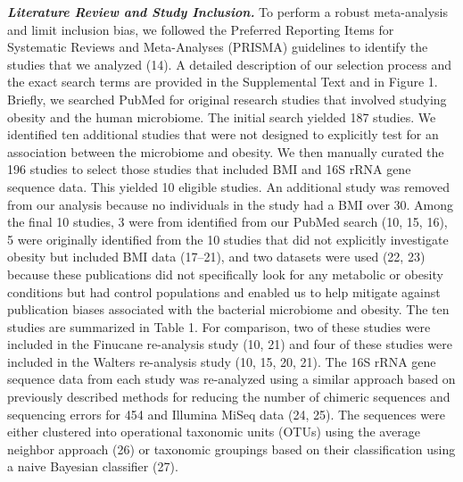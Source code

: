 \documentclass[12pt,]{article}
\begin{document}
\textbf{\emph{Literature Review and Study Inclusion.}} To perform a
robust meta-analysis and limit inclusion bias, we followed the Preferred
Reporting Items for Systematic Reviews and Meta-Analyses (PRISMA)
guidelines to identify the studies that we analyzed (14). A detailed
description of our selection process and the exact search terms are
provided in the Supplemental Text and in Figure 1. Briefly, we searched
PubMed for original research studies that involved studying obesity and
the human microbiome. The initial search yielded 187 studies. We
identified ten additional studies that were not designed to explicitly
test for an association between the microbiome and obesity. We then
manually curated the 196 studies to select those studies that included
BMI and 16S rRNA gene sequence data. This yielded 10 eligible studies.
An additional study was removed from our analysis because no individuals
in the study had a BMI over 30. Among the final 10 studies, 3 were from
identified from our PubMed search (10, 15, 16), 5 were originally
identified from the 10 studies that did not explicitly investigate
obesity but included BMI data (17--21), and two datasets were used (22,
23) because these publications did not specifically look for any
metabolic or obesity conditions but had control populations and enabled
us to help mitigate against publication biases associated with the
bacterial microbiome and obesity. The ten studies are summarized in
Table 1. For comparison, two of these studies were included in the
Finucane re-analysis study (10, 21) and four of these studies were
included in the Walters re-analysis study (10, 15, 20, 21). The 16S rRNA
gene sequence data from each study was re-analyzed using a similar
approach based on previously described methods for reducing the number
of chimeric sequences and sequencing errors for 454 and Illumina MiSeq
data (24, 25). The sequences were either clustered into operational
taxonomic units (OTUs) using the average neighbor approach (26) or
taxonomic groupings based on their classification using a naive Bayesian
classifier (27).
\end{document}
